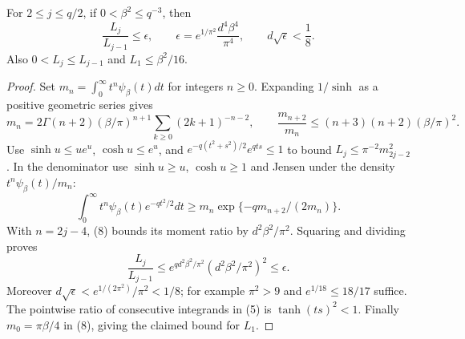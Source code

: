 \documentclass[11pt]{article}
\begin{document}
\begin{lemma}\label{lem:ratio}
For $2\le j\le q/2$, if $0<\beta^2\le q^{-3}$, then
\[
 \frac{L_j}{L_{j-1}}\le\epsilon,
 \qquad \epsilon=e^{1/\pi^2}\frac{d^4\beta^4}{\pi^4},
 \qquad d\sqrt\epsilon<\frac18.                         \tag{7}
\]
Also $0<L_j\le L_{j-1}$ and $L_1\le\beta^2/16$.
\end{lemma}
\begin{proof}
Set $m_n=\int_0^\infty t^n\psi_\beta(t)dt$ for integers $n\ge0$.
Expanding $1/\sinh$ as a positive geometric series gives
\[
 m_n=2\Gamma(n+2)(\beta/\pi)^{n+1}
                \sum_{k\ge0}(2k+1)^{-n-2},\qquad
 \frac{m_{n+2}}{m_n}\le(n+3)(n+2)(\beta/\pi)^2.          \tag{8}
\]
Use $\sinh u\le ue^u$, $\cosh u\le e^u$, and
$e^{-q(t^2+s^2)/2}e^{qts}\le1$ to bound
$L_j\le\pi^{-2}m_{2j-2}^2$.
In the denominator use $\sinh u\ge u$, $\cosh u\ge1$ and Jensen
under the density $t^n\psi_\beta(t)/m_n$:
\[
 \int_0^\infty t^n\psi_\beta(t)e^{-qt^2/2}dt
       \ge m_n\exp\{-q m_{n+2}/(2m_n)\}.
\]
With $n=2j-4$, (8) bounds its moment ratio by $d^2\beta^2/\pi^2$.
Squaring and dividing proves
\[
 \frac{L_j}{L_{j-1}}
 \le e^{qd^2\beta^2/\pi^2}(d^2\beta^2/\pi^2)^2\le\epsilon.
\]
Moreover $d\sqrt\epsilon<e^{1/(2\pi^2)}/\pi^2<1/8$;
for example $\pi^2>9$ and $e^{1/18}\le18/17$ suffice.
The pointwise ratio of consecutive integrands in (5) is
$\tanh(ts)^2<1$. Finally $m_0=\pi\beta/4$ in (8), giving the
claimed bound for $L_1$.
\end{proof}
\end{document}
